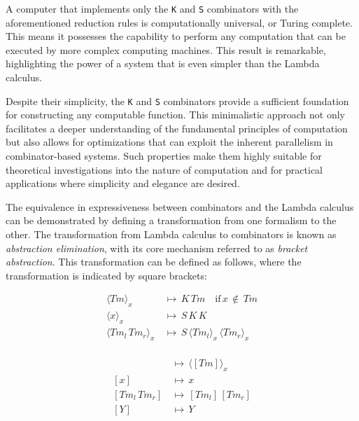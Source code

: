\documentclass{IEEEtran}
\begin{document}
\begingroup
\vspace*{-\baselineskip}
\vspace*{\baselineskip}
\endgroup

\par A computer that implements only the \verb!K! and \verb!S! combinators with the aforementioned reduction rules is computationally universal, or Turing complete. This means it possesses the capability to perform any computation that can be executed by more complex computing machines. This result is remarkable, highlighting the power of a system that is even simpler than the Lambda calculus.

\par Despite their simplicity, the \verb!K! and \verb!S! combinators provide a sufficient foundation for constructing any computable function. This minimalistic approach not only facilitates a deeper understanding of the fundamental principles of computation but also allows for optimizations that can exploit the inherent parallelism in combinator-based systems. Such properties make them highly suitable for theoretical investigations into the nature of computation and for practical applications where simplicity and elegance are desired.

\par The equivalence in expressiveness between combinators and the Lambda calculus can be demonstrated by defining a transformation from one formalism to the other. The transformation from Lambda calculus to combinators is known as \textit{abstraction elimination}, with its core mechanism referred to as \textit{bracket abstraction}. This transformation can be defined as follows, where the transformation is indicated by square brackets:

\begin{align*}
\langle Tm \rangle _x \, &\mapsto \, K \, Tm \quad \text{if} \, x \, \notin \, Tm \\
\langle x \rangle _x \, &\mapsto \, S \, K \, K \\
\langle Tm_l \, Tm_r \rangle _x \, &\mapsto \, S \,  \langle Tm_l \rangle _x \, \langle Tm_r \rangle _x \\
\end{align*}

\begin{align*}
[\lambda \, x \, . \, Tm] \, &\mapsto \, \langle [Tm] \rangle _x \\
[x] \, &\mapsto \, x \\
[Tm_l \, Tm_r] \, &\mapsto \, [Tm_l] \, [Tm_r] \\
[Y] \, &\mapsto \, Y
\end{align*}
\end{document}
